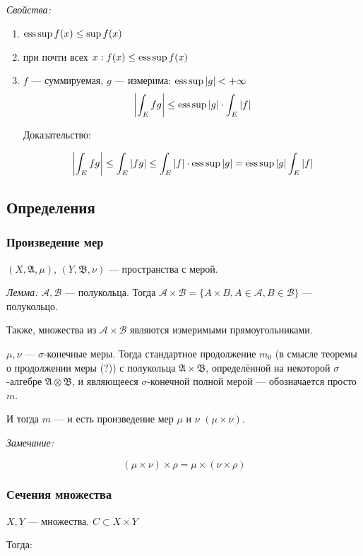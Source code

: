 \documentclass{article}
\begin{document}
\textit{Свойства: }
\begin{enumerate}
    \item $\operatorname*{ess\,sup} f(x) \le \sup f(x)$
    \item при почти всех $x: f(x) \le \operatorname*{ess\,sup} f(x)$
    \item $f$ --- суммируемая, $g$ --- измерима: $\operatorname*{ess\,sup} |g| < + \infty$
    \[\left|\int_{E} fg\right| \le \operatorname*{ess\,sup} |g| \cdot \int_{E} |f|\]

    Доказательство:

    \[\left|\int_{E} fg\right| \le \int_{E} |fg| \le \int_{E} |f| \cdot \operatorname*{ess\,sup} |g| = \operatorname*{ess\,sup} |g| \int_{E} |f|\]
\end{enumerate}

\newpage

\subsection{Определения}
\subsubsection{Произведение мер}
$(X, \mathfrak{A}, \mu)$, $(Y, \mathfrak{B}, \nu)$ --- пространства с мерой.

\textit{Лемма: }
$\mathcal{A}, \mathcal{B}$ --- полукольца. Тогда $\mathcal{A} \times \mathcal{B} = \{A \times B, A \in \mathcal{A}, B \in \mathcal{B}\}$ --- полукольцо.

Также, множества из $\mathcal{A} \times \mathcal{B}$ являются измеримыми прямоугольниками.

$\mu, \nu$ --- $\sigma$-конечные меры. Тогда стандартное продолжение $m_{0}$ (в смысле теоремы о продолжении меры (?)) с полукольца $\mathfrak{A} \times \mathfrak{B}$, определённой на некоторой $\sigma$-алгебре $\mathfrak{A} \otimes \mathfrak{B}$, и являющееся $\sigma$-конечной полной мерой --- обозначается просто $m$.

И тогда $m$ --- и есть произведение мер $\mu$ и $\nu$ $(\mu \times \nu)$.

\textit{Замечание: }

\[(\mu \times \nu) \times \rho = \mu \times (\nu \times \rho)\]

\subsubsection{Сечения множества}

$X, Y$ --- множества. $C \subset X \times Y$

Тогда: 
\end{document}

